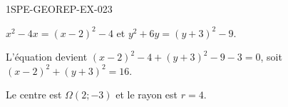 \begin{corrige}{1SPE-GEOREP-EX-023}


$x^2 - 4x = (x - 2)^2 - 4$ et $y^2 + 6y = (y + 3)^2 - 9$.

L'équation devient $(x - 2)^2 - 4 + (y + 3)^2 - 9 - 3 = 0$, soit $(x - 2)^2 + (y + 3)^2 = 16$.

Le centre est $\Omega(2 ; -3)$ et le rayon est $r = 4$.

\end{corrige}
